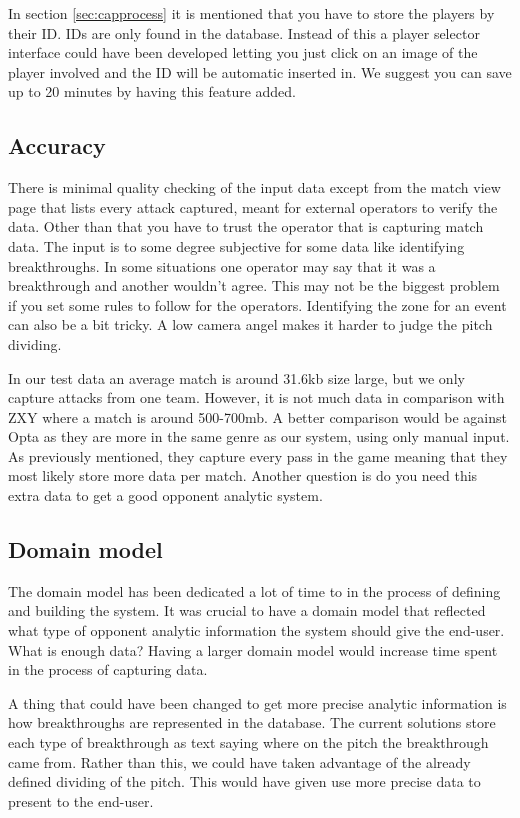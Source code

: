 In section \ref{sec:capprocess} it is mentioned that you have to store the players by their ID. IDs are only found in the database. Instead of this a player selector interface could have been developed letting you just click on an image of the player involved and the ID will be automatic inserted in. We suggest you can save up to 20 minutes by having this feature added.

\subsection{Accuracy}

There is minimal quality checking of the input data except from the match view page that lists every attack captured, meant for external operators to verify the data. Other than that you have to trust the operator that is capturing match data. The input is to some degree subjective for some data like identifying breakthroughs. In some situations one operator may say that it was a breakthrough and another wouldn't agree. This may not be the biggest problem if you set some rules to follow for the operators. Identifying the zone for an event can also be a bit tricky. A low camera angel makes it harder to judge the pitch dividing. 

In our test data an average match is around 31.6kb size large, but we only capture attacks from one team. However, it is not much data in comparison with ZXY where a match is around 500-700mb. A better comparison would be against Opta as they are more in the same genre as our system, using only manual input. As previously mentioned, they capture every pass in the game meaning that they most likely store more data per match. Another question is do you need this extra data to get a good opponent analytic system.

\subsection{Domain model}
The domain model has been dedicated a lot of time to in the process of defining and building the system. It was crucial to have a domain model that reflected what type of opponent analytic information the system should give the end-user. What is enough data? Having a larger domain model would increase time spent in the process of capturing data. 

A thing that could have been changed to get more precise analytic information is how breakthroughs are represented in the database. The current solutions store each type of breakthrough as text saying where on the pitch the breakthrough came from. Rather than this, we could have taken advantage of the already defined dividing of the pitch. This would have given use more precise data to present to the end-user.

